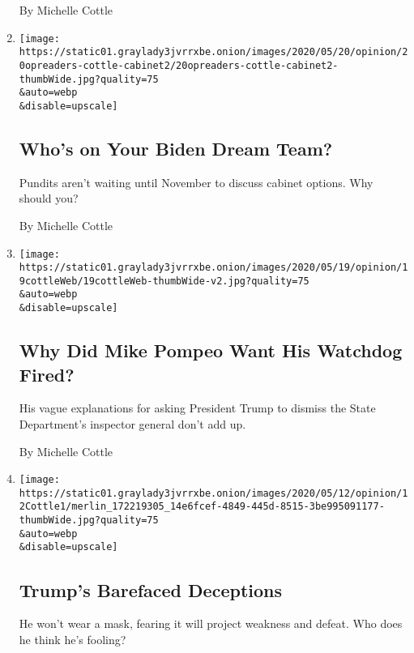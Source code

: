 \begin{enumerate}
  By Michelle Cottle
\item
  \href{/2020/05/20/opinion/biden-vice-president-cabinet.html}{}

  \texttt{[image: https://static01.graylady3jvrrxbe.onion/images/2020/05/20/opinion/20opreaders-cottle-cabinet2/20opreaders-cottle-cabinet2-thumbWide.jpg?quality=75\\\&auto=webp\\\&disable=upscale]}

  \hypertarget{whos-on-your-biden-dream-team}{%
  \subsection{Who's on Your Biden Dream
  Team?}\label{whos-on-your-biden-dream-team}}

  Pundits aren't waiting until November to discuss cabinet options. Why
  should you?

  By Michelle Cottle
\item
  \href{/2020/05/19/opinion/pompeo-state-department-inspector-general.html}{}

  \texttt{[image: https://static01.graylady3jvrrxbe.onion/images/2020/05/19/opinion/19cottleWeb/19cottleWeb-thumbWide-v2.jpg?quality=75\\\&auto=webp\\\&disable=upscale]}

  \hypertarget{why-did-mike-pompeo-want-his-watchdog-fired}{%
  \subsection{Why Did Mike Pompeo Want His Watchdog
  Fired?}\label{why-did-mike-pompeo-want-his-watchdog-fired}}

  His vague explanations for asking President Trump to dismiss the State
  Department's inspector general don't add up.

  By Michelle Cottle
\item
  \href{/2020/05/12/opinion/trump-pence-coronavirus-masks.html}{}

  \texttt{[image: https://static01.graylady3jvrrxbe.onion/images/2020/05/12/opinion/12Cottle1/merlin\_172219305\_14e6fcef-4849-445d-8515-3be995091177-thumbWide.jpg?quality=75\\\&auto=webp\\\&disable=upscale]}

  \hypertarget{trumps-barefaced-deceptions}{%
  \subsection{Trump's Barefaced
  Deceptions}\label{trumps-barefaced-deceptions}}

  He won't wear a mask, fearing it will project weakness and defeat. Who
  does he think he's fooling?


\end{enumerate}

